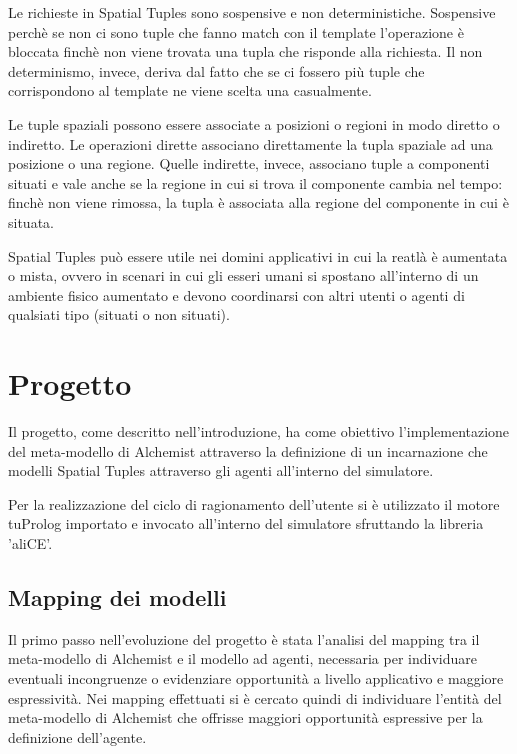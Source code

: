 \documentclass[12pt,a4paper,openright,twoside]{report}
\begin{document}
Le richieste in Spatial Tuples sono sospensive e non deterministiche. Sospensive perch\`e se non ci sono tuple che fanno match con il template l'operazione \`e bloccata finch\`e non viene trovata una tupla che risponde alla richiesta. Il non determinismo, invece, deriva dal fatto che se ci fossero pi\`u tuple che corrispondono al template ne viene scelta una casualmente.

Le tuple spaziali possono essere associate a posizioni o regioni in modo diretto o indiretto. Le operazioni dirette associano direttamente la tupla spaziale ad una posizione o una regione. Quelle indirette, invece, associano tuple a componenti situati e vale anche se la regione in cui si trova il componente cambia nel tempo: finch\`e non viene rimossa, la tupla \`e associata alla regione del componente in cui \`e situata.

Spatial Tuples pu\`o essere utile nei domini applicativi in cui la reatl\`a \`e aumentata o mista, ovvero in scenari in cui gli esseri umani si spostano all'interno di un ambiente fisico aumentato e devono coordinarsi con altri utenti o agenti di qualsiati tipo (situati o non situati).

\chapter{Progetto}
\lhead[\fancyplain{}{\bfseries\thepage}]{\fancyplain{}{\bfseries\rightmark}}

Il progetto, come descritto nell'introduzione, ha come obiettivo l'implementazione del meta-modello di Alchemist attraverso la definizione di un incarnazione che modelli Spatial Tuples attraverso gli agenti all'interno del simulatore.

Per la realizzazione del ciclo di ragionamento dell'utente si \`e utilizzato il motore tuProlog importato e invocato all'interno del simulatore sfruttando la libreria 'aliCE'.

\section{Mapping dei modelli}
Il primo passo nell'evoluzione del progetto \`e stata l'analisi del mapping tra il meta-modello di Alchemist e il modello ad agenti, necessaria per individuare eventuali incongruenze o evidenziare opportunit\`a a livello applicativo e maggiore espressivit\`a.
Nei mapping effettuati si \`e cercato quindi di individuare l'entit\`a del meta-modello di Alchemist che offrisse maggiori opportunit\`a espressive per la definizione dell'agente.
\end{document}
